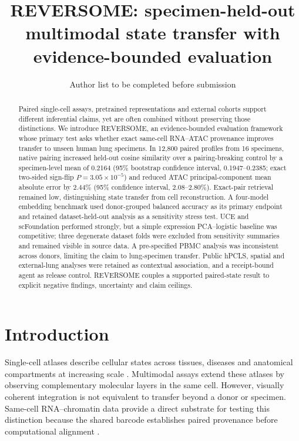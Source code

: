 \documentclass[11pt]{article}
\title{REVERSOME: specimen-held-out multimodal state transfer with evidence-bounded evaluation}
\author{Author list to be completed before submission}
\date{}
\begin{document}
\maketitle

\begin{abstract}
Paired single-cell assays, pretrained representations and external cohorts support different inferential claims, yet are often combined without preserving those distinctions. We introduce REVERSOME, an evidence-bounded evaluation framework whose primary test asks whether exact same-cell RNA--ATAC provenance improves transfer to unseen human lung specimens. In 12,800 paired profiles from 16 specimens, native pairing increased held-out cosine similarity over a pairing-breaking control by a specimen-level mean of 0.2164 (95\% bootstrap confidence interval, 0.1947--0.2385; exact two-sided sign-flip $P=3.05\times10^{-5}$) and reduced ATAC principal-component mean absolute error by 2.44\% (95\% confidence interval, 2.08--2.80\%). Exact-pair retrieval remained low, distinguishing state transfer from cell reconstruction. A four-model embedding benchmark used donor-grouped balanced accuracy as its primary endpoint and retained dataset-held-out analysis as a sensitivity stress test. UCE and scFoundation performed strongly, but a simple expression PCA--logistic baseline was competitive; three degenerate dataset folds were excluded from sensitivity summaries and remained visible in source data. A pre-specified PBMC analysis was inconsistent across donors, limiting the claim to lung-specimen transfer. Public hPCLS, spatial and external-lung analyses were retained as contextual association, and a receipt-bound agent as release control. REVERSOME couples a supported paired-state result to explicit negative findings, uncertainty and claim ceilings.
\end{abstract}

\section*{Introduction}

Single-cell atlases describe cellular states across tissues, diseases and anatomical compartments at increasing scale \cite{Travaglini2020,Sikkema2023}. Multimodal assays extend these atlases by observing complementary molecular layers in the same cell. However, visually coherent integration is not equivalent to transfer beyond a donor or specimen. Same-cell RNA--chromatin data provide a direct substrate for testing this distinction because the shared barcode establishes paired provenance before computational alignment \cite{Ma2020,Long2024}.
\end{document}
